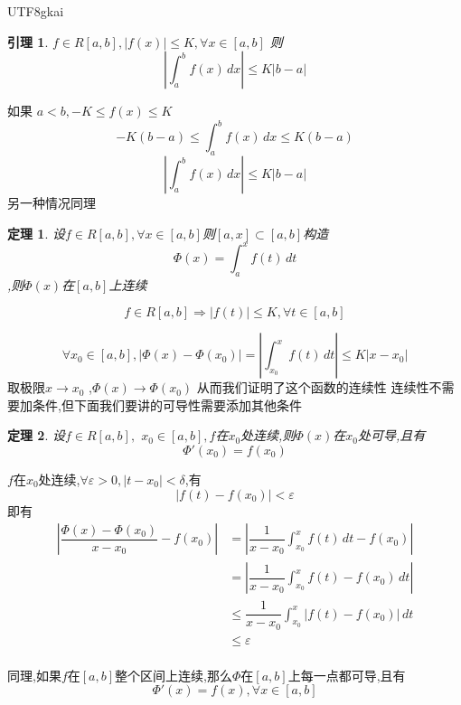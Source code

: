 \documentclass{article}
\newtheorem{theorem}{定理}[subsection]
\newtheorem{lemma}{引理}[subsection]
\newenvironment{cproof}{%
\heiti{证明}\kaishu
}{%
}
\newcommand{\abs}[1]{\left|#1\right|}
\begin{document}
\begin{CJK}{UTF8}{gkai}
\begin{lemma}
  $f\in R[a,b] ,|f(x)| \leq K ,\forall x\in [a,b]$
  则\[\abs{\int_{a}^{b}f(x)\,dx} \leq K|b - a|\]
\end{lemma}

\begin{cproof}
如果 $a < b, -K \leq f(x) \leq K$\\
\[-K(b - a) \leq \int_{a}^{b}f(x) \, dx \leq K(b - a)\]
\[\abs{\int_{a}^{b}f(x)\,dx} \leq K|b - a|\]
另一种情况同理
\end{cproof}
\begin{theorem}

设$f\in R[a,b],\forall x\in [a,b]$则$ [a,x] \subset[a,b]$构造
\[\varPhi(x) = \int_{a}^{x}f(t)\,dt\],则$\varPhi(x)$在$[a,b]$上连续\\
  
\end{theorem}
\begin{cproof}
\[f\in R[a,b]\Rightarrow \abs{f(t)} \leq K,\forall t\in [a,b]\]

\[\forall x_0 \in [a,b], \abs{\varPhi(x) - \varPhi(x_0)} = \abs{\int_{x_0}^{x} f(t)\,dt}
\leq K|x - x_0|\]
取极限$x\to x_0$ ,$\varPhi(x) \to \varPhi(x_0)$
从而我们证明了这个函数的连续性
\end{cproof}
连续性不需要加条件,但下面我们要讲的可导性需要添加其他条件

\begin{theorem}
设$f\in R[a,b],$ $x_0\in [a,b],f$在$x_0$处连续,则$\varPhi(x)$在$x_0$处可导,且有
\[\varPhi'(x_0) = f(x_0)\]
\end{theorem}

\begin{cproof}
  $f$在$x_0$处连续,$\forall \varepsilon > 0,|t - x_0| <\delta$,有
  \[|f(t) - f(x_0)|< \varepsilon\]
  即有
  \[
  \begin{aligned}  
  \abs{\dfrac{\varPhi(x) - \varPhi(x_0)}{x - x_0} - f(x_0)} &= \abs{\dfrac{1}{x - x_0} \int_{x_0}^{x}f(t)\,dt - f(x_0)}\\
  &= \abs{\dfrac{1}{x - x_0} \int_{x_0}^{x}f(t)- f(x_0)\,dt}\\ 
  &\leq \dfrac{1}{x - x_0} \int_{x_0}^{x}\abs{f(t)- f(x_0)}\,dt\\
  &\leq \varepsilon\\
  \end{aligned}
  \]
\end{cproof}

同理,如果$f$在$[a,b]$整个区间上连续,那么$\varPhi$在$[a,b]$上每一点都可导,且有
\[\varPhi'(x) = f(x),\forall x\in[a,b]\]


\end{CJK}
\end{document}
